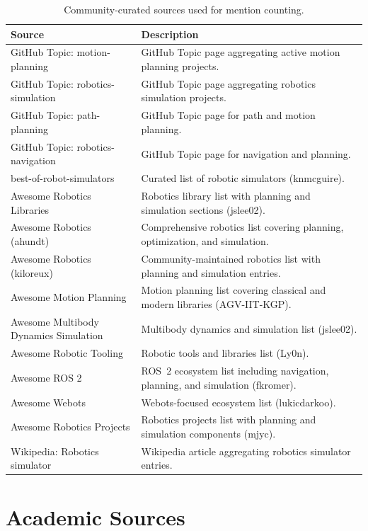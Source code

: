 \begin{table}[htbp]
\centering
\caption{Community-curated sources used for mention counting.}
\label{tab:community-mention-sources}
\small
\singlespacing
\begin{tabular}{@{}p{4.6cm}p{8.2cm}@{}}
\toprule
\textbf{Source} & \textbf{Description} \\
\midrule
GitHub Topic: motion-planning & GitHub Topic page aggregating active motion planning projects. \\
GitHub Topic: robotics-simulation & GitHub Topic page aggregating robotics simulation projects. \\
GitHub Topic: path-planning & GitHub Topic page for path and motion planning. \\
GitHub Topic: robotics-navigation & GitHub Topic page for navigation and planning. \\
best-of-robot-simulators & Curated list of robotic simulators (knmcguire). \\
Awesome Robotics Libraries & Robotics library list with planning and simulation sections (jslee02). \\
Awesome Robotics (ahundt) & Comprehensive robotics list covering planning, optimization, and simulation. \\
Awesome Robotics (kiloreux) & Community-maintained robotics list with planning and simulation entries. \\
Awesome Motion Planning & Motion planning list covering classical and modern libraries (AGV-IIT-KGP). \\
Awesome Multibody Dynamics Simulation & Multibody dynamics and simulation list (jslee02). \\
Awesome Robotic Tooling & Robotic tools and libraries list (Ly0n). \\
Awesome ROS 2 & ROS~2 ecosystem list including navigation, planning, and simulation (fkromer). \\
Awesome Webots & Webots-focused ecosystem list (lukicdarkoo). \\
Awesome Robotics Projects & Robotics projects list with planning and simulation components (mjyc). \\
Wikipedia: Robotics simulator & Wikipedia article aggregating robotics simulator entries. \\
\bottomrule
\end{tabular}
\end{table}

\section*{Academic Sources}

